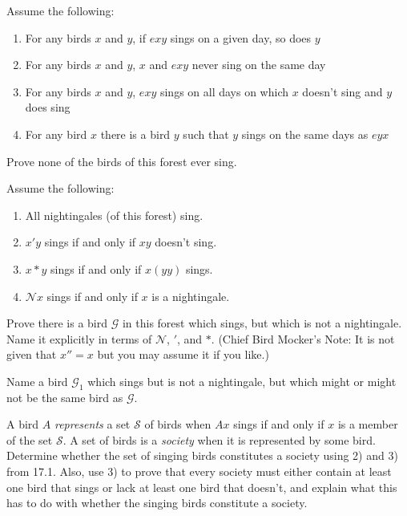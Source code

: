 \documentclass[12pt, letterpaper]{article}
\begin{document}
\begin{prob}{16.1} 
Assume the following:

\begin{enumerate}[label=\textbf{\arabic*)},itemsep=0mm]
  \item For any birds $x$ and $y$, if $exy$ sings on a given day, so does $y$
  \item For any birds $x$ and $y$, $x$ and $exy$ never sing on the same day
  \item For any birds $x$ and $y$, $exy$ sings on all days on which $x$ doesn't sing and $y$ does sing
  \item For any bird $x$ there is a bird $y$ such that $y$ sings on the same days as $eyx$
\end{enumerate}

\noindent Prove none of the birds of this forest ever sing.
\end{prob}

\begin{prob}{17.1}
Assume the following:

\begin{enumerate}[label=\textbf{\arabic*)},itemsep=0mm]
\item All nightingales (of this forest) sing.
\item $x'y$ sings if and only if $xy$ doesn't sing.
\item $x*y$ sings if and only if $x(yy)$ sings.
\item $\mathscr{N}x$ sings if and only if $x$ is a nightingale.
\end{enumerate}

Prove there is a bird $\mathscr{G}$ in this forest which sings, but which is not a nightingale. Name it explicitly in terms of $\mathscr{N}$, $'$, and $*$. (Chief Bird Mocker's Note: It is not given that $x'' = x$ but you may assume it if you like.)
\end{prob}

\begin{prob}{17.2} 
Name a bird $\mathscr{G}_1$ which sings but is not a nightingale, but which might or might not be the same bird as $\mathscr{G}$.
\end{prob}

\begin{prob}{17.3} 
A bird $A$ \emph{represents} a set $\mathscr{S}$ of birds when $Ax$ sings if and only if $x$ is a member of the set $\mathscr{S}$. A set of birds is a \emph{society} when it is represented by some bird. Determine whether the set of singing birds constitutes a society using 2) and 3) from 17.1. Also, use 3) to prove that every society must either contain at least one bird that sings or lack at least one bird that doesn't, and explain what this has to do with whether the singing birds constitute a society.
\end{prob}
\end{document}
